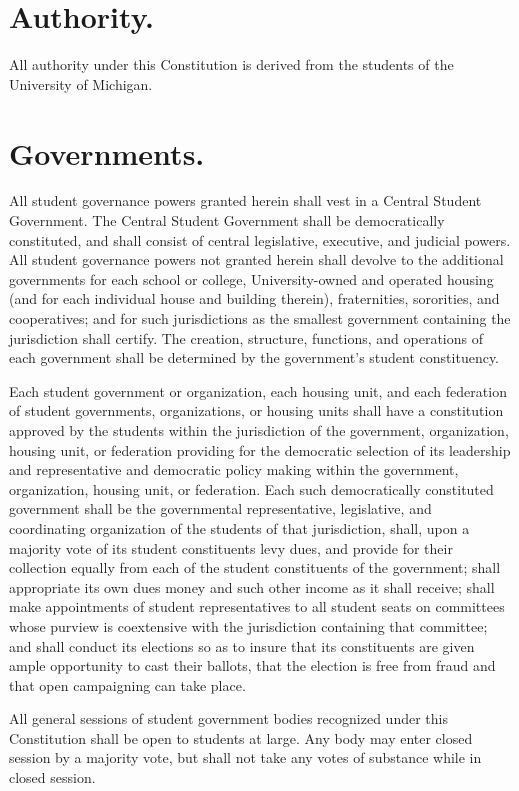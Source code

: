 \section{Authority.}
    All authority under this Constitution is derived from the students of the University of Michigan.


\section{Governments.}
    All student governance powers granted herein shall vest in a Central Student Government. The Central Student Government shall be democratically constituted, and shall consist of central legislative, executive, and judicial powers. All student governance powers not granted herein shall devolve to the additional governments for each school or college, University-owned and operated housing (and for each individual house and building therein), fraternities, sororities, and cooperatives; and for such jurisdictions as the smallest government containing the jurisdiction shall certify. The creation, structure, functions, and operations of each government shall be determined by the government's student constituency.

    Each student government or organization, each housing unit, and each federation of student governments, organizations, or housing units shall have a constitution approved by the students within the jurisdiction of the government, organization, housing unit, or federation providing for the democratic selection of its leadership and representative and democratic policy making within the government, organization, housing unit, or federation. Each such democratically constituted government shall be the governmental representative, legislative, and coordinating organization of the students of that jurisdiction, shall, upon a majority vote of its student constituents levy dues, and provide for their collection equally from each of the student constituents of the government; shall appropriate its own dues money and such other income as it shall receive; shall make appointments of student representatives to all student seats on committees whose purview is coextensive with the jurisdiction containing that committee; and  shall conduct its elections so as to insure that its constituents are given ample opportunity to cast their ballots, that the election is free from fraud and that open campaigning can take place.

    All general sessions of student government bodies recognized under this Constitution shall be open to students at large. Any body may enter closed session by a majority vote, but shall not take any votes of substance while in closed session.


